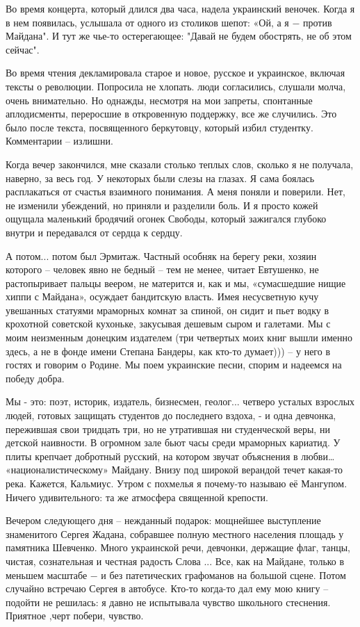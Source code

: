 Во время концерта, который длился два часа, надела украинский веночек. Когда я
в нем появилась, услышала от одного из столиков шепот: «Ой, а я − против
Майдана". И тут же чье-то остерегающее: "Давай не будем обострять, не  об этом
сейчас". 

Во время чтения декламировала старое и новое, русское и украинское, включая
тексты о революции. Попросила не хлопать. люди согласились, слушали молча,
очень внимательно. Но однажды, несмотря на мои запреты, спонтанные
аплодисменты, переросшие в откровенную поддержку, все же случились. Это было
после текста, посвященного беркутовцу, который избил студентку. Комментарии –
излишни.

Когда вечер закончился, мне сказали столько теплых слов, сколько я не получала,
наверно, за весь год. У некоторых были слезы на глазах. Я сама боялась
расплакаться от счастья взаимного понимания. А меня поняли и поверили. Нет, не
изменили убеждений, но приняли и разделили боль. И я просто кожей ощущала
маленький бродячий огонек Свободы, который зажигался глубоко внутри и
передавался от сердца к сердцу.

А потом... потом был Эрмитаж. Частный особняк на берегу реки, хозяин которого –
человек явно не бедный – тем не менее, читает Евтушенко, не растопыривает
пальцы веером, не матерится и, как и мы, «сумасшедшие нищие хиппи с Майдана»,
осуждает бандитскую власть. Имея несусветную кучу увешанных статуями мраморных
комнат за спиной, он сидит и пьет водку в крохотной советской кухоньке,
закусывая дешевым сыром  и галетами. Мы с моим неизменным донецким издателем
(три четвертых моих книг вышли именно здесь, а не в фонде имени Степана
Бандеры, как кто-то думает))) – у него в гостях и говорим о Родине. Мы поем
украинские песни, спорим и надеемся на победу добра. 

Мы - это: поэт, историк, издатель, бизнесмен, геолог... четверо усталых
взрослых людей, готовых защищать студентов до последнего вздоха, - и одна
девчонка, пережившая свои тридцать три, но не утратившая ни студенческой веры,
ни детской наивности. В огромном зале бьют часы среди мраморных кариатид. У
плиты крепчает добротный русский, на котором звучат объяснения в любви…
«националистическому» Майдану. Внизу под широкой верандой течет какая-то река.
Кажется, Кальмиус. Утром с похмелья я почему-то называю её Мангупом. Ничего
удивительного: та же атмосфера священной крепости. 

Вечером следующего дня – нежданный подарок: мощнейшее выступление знаменитого
Сергея Жадана, собравшее полную местного населения  площадь у памятника
Шевченко. Много украинской речи, девчонки, держащие флаг, танцы, чистая,
сознательная и честная радость Слова ... Все, как на Майдане, только в меньшем
масштабе − и без патетических графоманов на большой сцене. Потом случайно
встречаю Сергея в автобусе. Кто-то когда-то дал ему мою книгу – подойти не
решилась: я давно не испытывала чувство школьного стеснения. Приятное ,черт
побери, чувство. 

